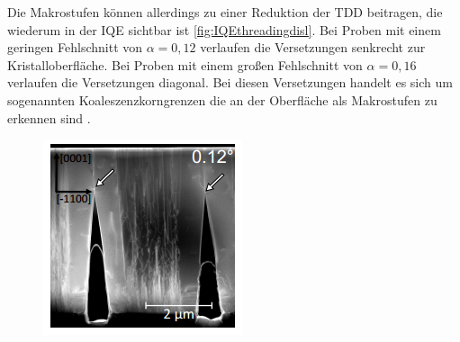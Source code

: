\raggedright
\vspace{1cm}
%
Die Makrostufen können allerdings zu einer Reduktion der TDD beitragen, die wiederum in der IQE sichtbar ist \ref{fig:IQEthreadingdisl}. Bei Proben mit einem geringen Fehlschnitt von $\alpha = 0,12 $ verlaufen die Versetzungen senkrecht zur Kristalloberfläche. Bei Proben mit einem großen Fehlschnitt von $\alpha = 0,16 $ verlaufen die Versetzungen diagonal. Bei diesen Versetzungen handelt es sich um sogenannten Koaleszenzkorngrenzen die an der Oberfläche als Makrostufen zu erkennen sind \cite{MOGILATENKO2014222}. 
%
\begin{figure}[htb]
  \centering
  \begin{minipage}[t]{0.49\textwidth}
    \centering
    \includegraphics[width=\textwidth]{Bilder/offcutsenkrecht.png}
    \label{}
  \end{minipage}
	\hfill
  \begin{minipage}[t]{0.49\textwidth}
    \centering

\end{minipage}
\end{figure}
